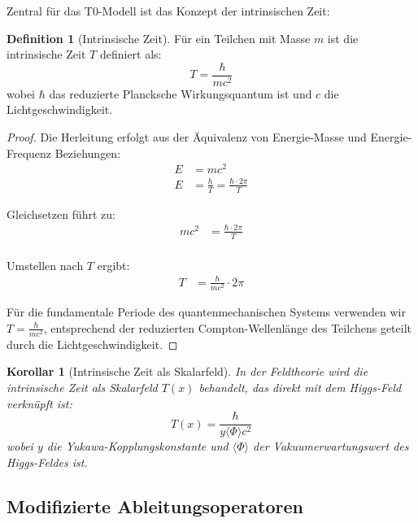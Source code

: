 \documentclass[a4paper,12pt]{article}
\newtheorem{corollary}[theorem]{Korollar}
\theoremstyle{definition}
\newtheorem{definition}[theorem]{Definition}
\theoremstyle{remark}
\begin{document}
	Zentral für das T0-Modell ist das Konzept der intrinsischen Zeit:
	
	\begin{definition}[Intrinsische Zeit]
		Für ein Teilchen mit Masse $m$ ist die intrinsische Zeit $T$ definiert als:
		\begin{equation}
			T = \frac{\hbar}{mc^2}
		\end{equation}
		wobei $\hbar$ das reduzierte Plancksche Wirkungsquantum ist und $c$ die Lichtgeschwindigkeit.
	\end{definition}
	
	\begin{proof}
		Die Herleitung erfolgt aus der Äquivalenz von Energie-Masse und Energie-Frequenz Beziehungen:
		\begin{align}
			E &= mc^2 \\
			E &= \frac{h}{T} = \frac{\hbar \cdot 2\pi}{T}
		\end{align}
		
		Gleichsetzen führt zu:
		\begin{align}
			mc^2 &= \frac{\hbar \cdot 2\pi}{T} \\
		\end{align}
		
		Umstellen nach $T$ ergibt:
		\begin{align}
			T &= \frac{\hbar}{mc^2} \cdot 2\pi
		\end{align}
		
		Für die fundamentale Periode des quantenmechanischen Systems verwenden wir $T = \frac{\hbar}{mc^2}$, entsprechend der reduzierten Compton-Wellenlänge des Teilchens geteilt durch die Lichtgeschwindigkeit.
	\end{proof}
	
	\begin{corollary}[Intrinsische Zeit als Skalarfeld]
		In der Feldtheorie wird die intrinsische Zeit als Skalarfeld $T(x)$ behandelt, das direkt mit dem Higgs-Feld verknüpft ist:
		\begin{equation}
			T(x) = \frac{\hbar}{y\langle\Phi\rangle c^2}
		\end{equation}
		wobei $y$ die Yukawa-Kopplungskonstante und $\langle\Phi\rangle$ der Vakuumerwartungswert des Higgs-Feldes ist.
	\end{corollary}
	
	\subsection{Modifizierte Ableitungsoperatoren}
	
\end{document}
